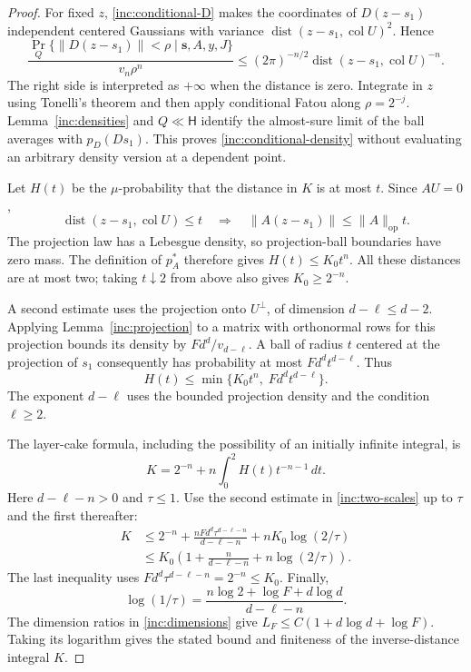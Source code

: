 \begin{proof}
For fixed \(z\), \eqref{inc:conditional-D} makes the coordinates of
\(D(z-s_1)\) independent centered Gaussians with variance
\(\operatorname{dist}(z-s_1,\operatorname{col}U)^2\).  Hence
\[
 \frac{\Pr_Q\{\|D(z-s_1)\|<\rho\mid\mathbf s,A,y,J\}}{v_n\rho^n}
 \le (2\pi)^{-n/2}
       \operatorname{dist}(z-s_1,\operatorname{col}U)^{-n}.
\]
The right side is interpreted as \(+\infty\) when the distance is zero.
Integrate in \(z\) using Tonelli's theorem and then apply conditional
Fatou along \(\rho=2^{-j}\).  Lemma~\ref{inc:densities} and
\(Q\ll\mathsf H\) identify the almost-sure limit of the ball averages
with \(p_D(Ds_1)\).  This proves \eqref{inc:conditional-density}
without evaluating an arbitrary density version at a dependent point.

Let \(H(t)\) be the \(\mu\)-probability that the distance in \(K\) is
at most \(t\).  Since \(AU=0\),
\[
 \operatorname{dist}(z-s_1,\operatorname{col}U)\le t
 \quad\Longrightarrow\quad
 \|A(z-s_1)\|\le\|A\|_{\mathrm{op}}t.
\]
The projection law has a Lebesgue density, so projection-ball
boundaries have zero mass.  The definition of \(p_A^*\) therefore gives
\(H(t)\le K_0t^n\).  All these distances are at most two; taking
\(t\downarrow2\) from above also gives \(K_0\ge2^{-n}\).

A second estimate uses the projection onto \(U^\perp\), of dimension
\(d-\ell\le d-2\).  Applying Lemma~\ref{inc:projection} to a matrix
with orthonormal rows for this projection bounds its density by
\(Fd^d/v_{d-\ell}\).  A ball of radius \(t\) centered at the projection
of \(s_1\) consequently has probability at most
\(Fd^dt^{d-\ell}\).  Thus
\begin{equation}\label{inc:two-scales}
 H(t)\le\min\{K_0t^n,\;Fd^dt^{d-\ell}\}.
\end{equation}
The exponent \(d-\ell\) uses the bounded projection density and the
condition \(\ell\ge2\).

The layer-cake formula, including the possibility of an initially
infinite integral, is
\[
 K=2^{-n}+n\int_0^2H(t)t^{-n-1}\,dt.
\]
Here \(d-\ell-n>0\) and \(\tau\le1\).  Use the second estimate in
\eqref{inc:two-scales} up to \(\tau\) and the first thereafter:
\[
 \begin{split}
 K&\le2^{-n}
   +\frac{nFd^d\tau^{d-\ell-n}}{d-\ell-n}
   +nK_0\log(2/\tau)\\
 &\le K_0\left(1+\frac{n}{d-\ell-n}+n\log(2/\tau)\right).
 \end{split}
\]
The last inequality uses
\(Fd^d\tau^{d-\ell-n}=2^{-n}\le K_0\).  Finally,
\[
 \log(1/\tau)
 =\frac{n\log2+\log F+d\log d}{d-\ell-n}.
\]
The dimension ratios in \eqref{inc:dimensions} give
\(L_F\le C(1+d\log d+\log F)\).  Taking its logarithm gives the
stated bound and finiteness of the inverse-distance integral \(K\).
\end{proof}

